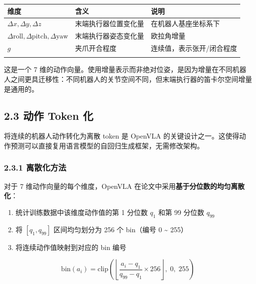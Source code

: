 \documentclass[
  chinese,
]{ctexart}
\providecommand{\tightlist}{%
  \setlength{\itemsep}{0pt}\setlength{\parskip}{0pt}}
\begin{document}
\begin{center}
\begin{tabular}{@{}>{\raggedright\arraybackslash}p{} >{\raggedright\arraybackslash}p{} >{\raggedright\arraybackslash}p{}@{}}
\toprule\noalign{}
维度 & 含义 & 说明 \\
\midrule\noalign{}
\(\Delta x, \Delta y, \Delta z\) & 末端执行器位置变化量 & 在机器人基座坐标系下 \\
\(\Delta \text{roll}, \Delta \text{pitch}, \Delta \text{yaw}\) & 末端执行器姿态变化量 & 欧拉角增量 \\
\(g\) & 夹爪开合程度 & 连续值，表示张开/闭合程度 \\
\bottomrule\noalign{}
\end{tabular}
\end{center}

这是一个 7
维的动作向量。使用增量表示而非绝对位姿，是因为增量在不同机器人之间更具迁移性：不同机器人的关节空间不同，但末端执行器的笛卡尔空间增量是通用的。

\subsection{2.3 动作 Token 化}\label{ux52a8ux4f5c-token-ux5316}

将连续的机器人动作转化为离散 token 是 OpenVLA
的关键设计之一。这使得动作预测可以直接复用语言模型的自回归生成框架，无需修改架构。

\subsubsection{2.3.1 离散化方法}\label{ux79bbux6563ux5316ux65b9ux6cd5}

对于 7 维动作向量的每个维度，OpenVLA
在论文中采用\textbf{基于分位数的均匀离散化}：

\begin{enumerate}
\def\labelenumi{\arabic{enumi}.}
\tightlist
\item
  统计训练数据中该维度动作值的第 1 分位数 \(q_1\) 和第 99 分位数
  \(q_{99}\)
\item
  将 \([q_1, q_{99}]\) 区间均匀划分为 256 个 bin（编号 0
  \textasciitilde{} 255）
\item
  将连续动作值映射到对应的 bin 编号
\end{enumerate}

\[
\text{bin}(a_i) = \text{clip}\!\left(\left\lfloor \frac{a_i - q_1}{q_{99} - q_1} \times 256 \right\rfloor,\; 0,\; 255\right)
\]
\end{document}
